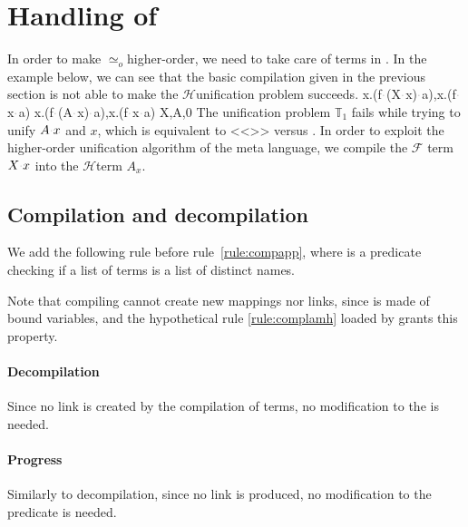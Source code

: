 \documentclass[sigconf,natbib=false,review]{acmart}
\newcommand{\appsep}{\ensuremath{\textcolor{lightgray}{\cdot}}}
\newcommand{\UnifRel}{\ensuremath{\simeq}}
\newcommand{\Uo}{\texorpdfstring{\ensuremath{\UnifRel_o}\xspace}{unif\_o}}
\newcommand{\Fo}{\texorpdfstring{\ensuremath{\mathcal{F}\xspace}}{F}} %
\newcommand{\Ho}{\texorpdfstring{\ensuremath{\mathcal{H}}\xspace}{H}}
\newcommand{\hoUnifPb}{\ensuremath{\mathbb{T}}\xspace}
\begin{document}
\section{Handling of \maybebeta}\label{sec:llam}

In order to make \Uo higher-order, we need to
take care of terms in \maybebeta.
In the example below, we can see that the basic compilation given in 
the previous section is not able to make the \Ho unification problem succeeds.
%
\printAlllSingle
  {{{\lambda x.(f\appsep (X\appsep x)\appsep a),\lambda x.(f\appsep x\appsep a)}}}
  {{{\lambda x.(f\appsep (A\appsep x)\appsep a),\lambda x.(f\appsep x\appsep a)}}}
  {{{X,A,0}}}
  {{}}
The unification problem $\hoUnifPb_1$ fails while trying to unify
$A \appsep x$ and $x$, which is equivalent to <<>>
versus .
In order to exploit the higher-order unification algorithm of the meta language,
we %
compile the \Fo{} term $X\appsep x$ into the \Ho term $A_x$.

\subsection{Compilation and decompilation}

We add the following rule before rule~\ref{rule:compapp}, where
 is a predicate checking if a list of
terms is a list of distinct names.



\noindent
Note that compiling  cannot create new mappings nor links, since 
is made of bound variables, and the hypothetical rule 
\ref{rule:complamh}
loaded by 
grants this property.


\paragraph{Decompilation} Since no link is created by the compilation of 
\maybebeta terms, no modification to the 
is needed.

\paragraph{Progress} Similarly to decompilation, since no link is produced,
no modification to the  predicate is needed.
\end{document}
